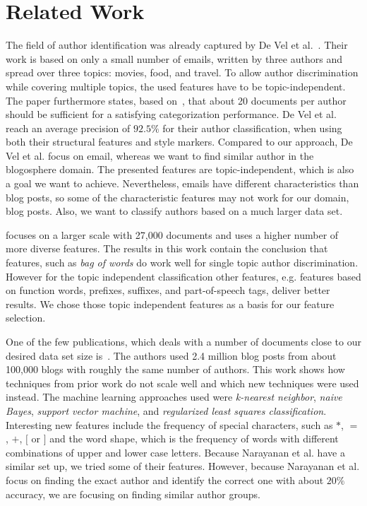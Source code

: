 
\section{Related Work}
\label{sec:related}


The field of author identification was already captured by De Vel et al.~\cite{de2001mining}.
Their work is based on only a small number of emails, written by three authors and spread over three topics: movies, food, and travel.
To allow author discrimination while covering multiple topics, the used features have to be topic-independent.
The paper furthermore states, based on~\cite{corney2001identifying}, that about 20 documents per author should be sufficient for a satisfying categorization performance.
De Vel et al. reach an average precision of $92.5\%$ for their author classification, when using both their structural features and style markers.
Compared to our approach, De Vel et al. focus on email, whereas we want to find similar author in the blogosphere domain.
The presented features are topic-independent, which is also a goal we want to achieve.
Nevertheless, emails have different characteristics than blog posts, so some of the characteristic features may not work for our domain, blog posts.
Also, we want to classify authors based on a much larger data set.


\cite{madigan2005author} focuses on a larger scale with 27,000 documents and uses a higher number of more diverse features.
The results in this work contain the conclusion that features, such as \textit{bag of words} do work well for single topic author discrimination.
However for the topic independent classification other features, e.g. features based on function words, prefixes, suffixes, and part-of-speech tags, deliver better results.
We chose those topic independent features as a basis for our feature selection.


One of the few publications, which deals with a number of documents close to our desired data set size is~\cite{narayanan2012feasibility}.
The authors used 2.4 million blog posts from about 100,000 blogs with roughly the same number of authors.
This work shows how techniques from prior work do not scale well and which new techniques were used instead.
The machine learning approaches used were \textit{k-nearest neighbor}, \textit{naive Bayes}, \textit{support vector machine}, and \textit{regularized least squares classification}.
Interesting new features include the frequency of special characters, such as $*$, $=$, $+$, $[$ or $]$ and the word shape, which is the frequency of words with different combinations of upper and lower case letters.
Because Narayanan et al. have a similar set up, we tried some of their features.
However, because Narayanan et al. focus on finding the exact author and identify the correct one with about $20\%$ accuracy, we are focusing on finding similar author groups.


